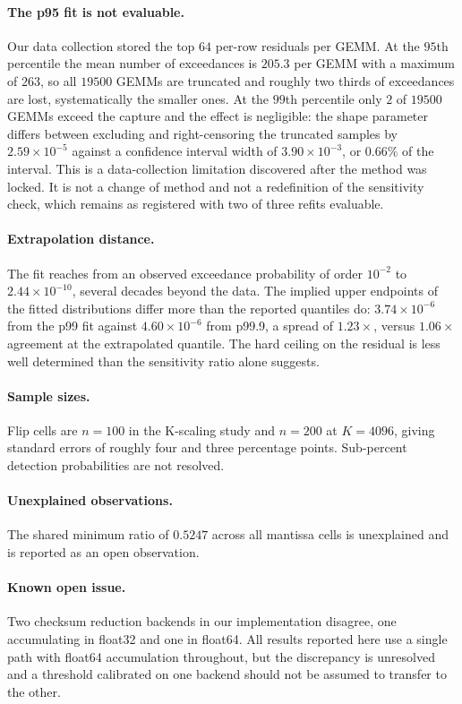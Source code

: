 \documentclass[11pt]{article}
\begin{document}
\paragraph{The p95 fit is not evaluable.}
Our data collection stored the top $64$ per-row residuals per GEMM. At the
$95$th percentile the mean number of exceedances is $205.3$ per GEMM with a
maximum of $263$, so all $19500$ GEMMs are truncated and roughly two thirds of
exceedances are lost, systematically the smaller ones. At the $99$th percentile
only $2$ of $19500$ GEMMs exceed the capture and the effect is negligible: the
shape parameter differs between excluding and right-censoring the truncated
samples by $2.59 \times 10^{-5}$ against a confidence interval width of
$3.90 \times 10^{-3}$, or $0.66\%$ of the interval. This is a data-collection
limitation discovered after the method was locked. It is not a change of
method and not a redefinition of the sensitivity check, which remains as
registered with two of three refits evaluable.

\paragraph{Extrapolation distance.}
The fit reaches from an observed exceedance probability of order $10^{-2}$ to
$2.44 \times 10^{-10}$, several decades beyond the data. The implied upper
endpoints of the fitted distributions differ more than the reported quantiles
do: $3.74 \times 10^{-6}$ from the p99 fit against $4.60 \times 10^{-6}$ from
p99.9, a spread of $1.23\times$, versus $1.06\times$ agreement at the
extrapolated quantile. The hard ceiling on the residual is less well determined
than the sensitivity ratio alone suggests.

\paragraph{Sample sizes.}
Flip cells are $n = 100$ in the K-scaling study and $n = 200$ at $K = 4096$,
giving standard errors of roughly four and three percentage points. Sub-percent
detection probabilities are not resolved.

\paragraph{Unexplained observations.}
The shared minimum ratio of $0.5247$ across all mantissa cells is unexplained
and is reported as an open observation.

\paragraph{Known open issue.}
Two checksum reduction backends in our implementation disagree, one
accumulating in float32 and one in float64. All results reported here use a
single path with float64 accumulation throughout, but the discrepancy is
unresolved and a threshold calibrated on one backend should not be assumed to
transfer to the other.
\end{document}
